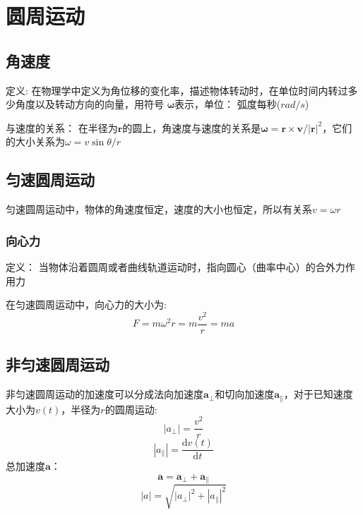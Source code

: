 \documentclass[a4paper,oneside,11pt]{article}
\newcommand{\bol}[1]{\textbf{#1}}
\newcommand{\diff}{\mathrm{d}}
\begin{document}
\section{圆周运动}

\subsection{角速度}
定义: 在物理学中定义为角位移的变化率，描述物体转动时，在单位时间内转过多少角度以及转动方向的向量，用符号
$\boldsymbol{\omega}$表示，单位： 弧度每秒($rad/s$)
\par 与速度的关系： 在半径为$\bol{r}$的圆上，角速度与速度的关系是$\boldsymbol{\omega} = \bol{r}\times\bol{v}/\vert\bol{r}\vert^2$，它们的大小关系为$\omega = v\sin \theta/r$
\subsection{匀速圆周运动}
匀速圆周运动中，物体的角速度恒定，速度的大小也恒定，所以有关系$v = \omega r$
\subsubsection{向心力}
定义： 当物体沿着圆周或者曲线轨道运动时，指向圆心（曲率中心）的合外力作用力
\par 在匀速圆周运动中，向心力的大小为:
\begin{displaymath}
	F = m\omega^2r = m\frac{v^2}{r} = ma
\end{displaymath}
\subsection{非匀速圆周运动}
非匀速圆周运动的加速度可以分成法向加速度$\bol{a}_\perp$和切向加速度$\bol{a}_\parallel$，对于已知速度大小为$v(t)$，半径为$r$的圆周运动:
\begin{displaymath}
	\left\vert a_\perp\right\vert = \frac{v^2}{r}
\end{displaymath}
\begin{displaymath}
	\left\vert a_\parallel \right\vert = \frac{\diff v(t)}{\diff t}
\end{displaymath}
总加速度$\bol{a}$：
\begin{displaymath}
	\bol{a} = \bol{a}_\perp + \bol{a}_\parallel
\end{displaymath}
\begin{displaymath}
	\vert a\vert = \sqrt{\left\vert a_\perp\right\vert^2 + \left\vert a_\parallel\right\vert^2}
\end{displaymath}
\newpage
\end{document}
